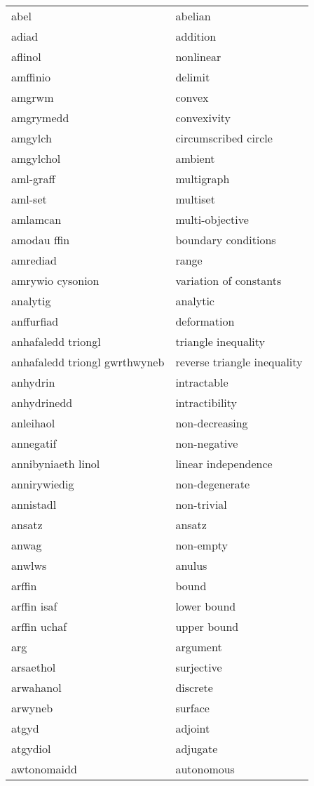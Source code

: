 \begin{supertabular}{p{0.22\textwidth}p{0.22\textwidth}}
\midrule
abel & abelian \\
adiad & addition \\
aflinol & nonlinear \\
amffinio & delimit \\
amgrwm & convex \\
amgrymedd & convexivity \\
amgylch & circumscribed circle \\
amgylchol & ambient \\
aml-graff & multigraph \\
aml-set & multiset \\
amlamcan & multi-objective \\
amodau ffin & boundary conditions \\
amrediad & range \\
amrywio cysonion & variation of constants \\
analytig & analytic \\
anffurfiad & deformation \\
anhafaledd triongl & triangle inequality \\
anhafaledd triongl gwrthwyneb & reverse triangle inequality \\
anhydrin & intractable \\
anhydrinedd & intractibility \\
anleihaol & non-decreasing \\
annegatif & non-negative \\
annibyniaeth linol & linear independence \\
annirywiedig & non-degenerate \\
annistadl & non-trivial \\
ansatz & ansatz \\
anwag & non-empty \\
anwlws & anulus \\
arffin & bound \\
arffin isaf & lower bound \\
arffin uchaf & upper bound \\
arg & argument \\
arsaethol & surjective \\
arwahanol & discrete \\
arwyneb & surface \\
atgyd & adjoint \\
atgydiol & adjugate \\
awtonomaidd & autonomous \\

\end{supertabular}

